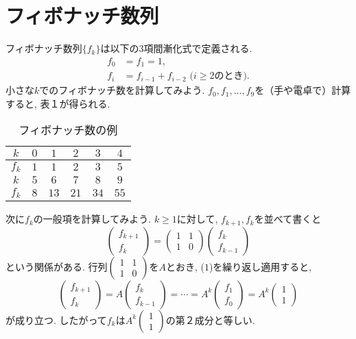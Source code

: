 \documentclass[a4paper,12pt]{jarticle}
\begin{document}
\section{フィボナッチ数列}
フィボナッチ数列$\{f_k \}$は以下の$3$項間漸化式で定義される.
\begin{align*} f_0 &= f_1 = 1,\\
f_i &= f_{i-1} +f_{i-2} \,\,\text{($i \geq 2$のとき).}
\end{align*}
小さな$k$でのフィボナッチ数を計算してみよう. $f_0,f_1,\ldots,f_9$を（手や電卓で）計算すると, 表１が得られる.
\begin{table}[h] \centering
\caption{フィボナッチ数の例} 
\vspace{0.5cm}
\begin{tabular}{c||c|c|c|c|c}
$k$ & $0$ & $1$ & $2$ & $3$ & $4$ \\ \hline
$f_k$ & $1$ & $1$ & $2$ & $3$ & $5$   \\ \hline \hline
$k$ & $5$ & $6$ & $7$ & $8$ & $9$ \\ \hline
$f_k$ & $8$ & $13$ & $21$ & $34$ & $55$ 
\end{tabular}
\end{table}

次に$f_k$の一般項を計算してみよう. $k \geq 1$に対して, $f_{k+1},f_{k}$を並べて書くと
\begin{equation} 
\begin{pmatrix} 
f_{k+1} \\ f_k 
\end{pmatrix} 
= \begin{pmatrix} 1 & 1 \\ 1 & 0 \end{pmatrix}
\begin{pmatrix} f_k \\ f_{k-1} \end{pmatrix}
\end{equation}
という関係がある. 行列$\left( \begin{smallmatrix} 1 & 1 \\ 1 & 0 \end{smallmatrix} \right)$を$A$とおき, ($1$)を繰り返し適用すると,
\begin{equation} 
\begin{pmatrix} f_{k+1} \\ f_k \end{pmatrix} = A \begin{pmatrix} f_k \\ f_{k-1} \end{pmatrix} = \cdots 
= A^k \begin{pmatrix} f_1 \\ f_0 \end{pmatrix} = A^k \begin{pmatrix} 1 \\ 1 \end{pmatrix} 
\end{equation}
が成り立つ. したがって$f_k$は$A^k \left( \begin{smallmatrix} 1 \\ 1 \end{smallmatrix} \right) $の第２成分と等しい.
\end{document}
